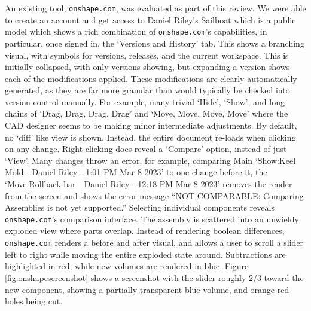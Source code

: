 \documentclass[sigconf,authorversion,nonacm]{acmart}
\begin{document}
An existing tool, \texttt{onshape.com}, was evaluated as part of this review.
We were able to create an account and get access to Daniel Riley's Sailboat
which is a public model which shows a rich combination of \texttt{onshape.com}'s capabilities, in particular, once signed in, the `Versions and History' tab.
This shows a branching visual, with symbols for versions, releases, and the current workspace.
This is initially collapsed, with only versions showing, but expanding a version shows each of the modifications applied.
These modifications are clearly automatically generated, as they are far more granular than would typically be checked into version control manually.
For example, many trivial `Hide', `Show', and long chains of `Drag, Drag, Drag, Drag' and `Move, Move, Move, Move' where the CAD designer seems to be making minor intermediate adjustments.
By default, no `diff' like view is shown.
Instead, the entire document re-loads when clicking on any change.
Right-clicking does reveal a `Compare' option, instead of just `View'.
Many changes throw an error, for example, comparing Main `Show:Keel Mold - Daniel Riley - 1:01 PM Mar 8 2023' to one change before it, the `Move:Rollback bar - Daniel Riley - 12:18 PM Mar 8 2023' removes the render from the screen and shows the error message ``NOT COMPARABLE: Comparing Assemblies is not yet supported.''
Selecting individual components reveals \texttt{onshape.com}'s comparison interface.
The assembly is scattered into an unwieldy exploded view where parts overlap.
Instead of rendering boolean differences, \texttt{onshape.com} renders a before and after visual, and allows a user to scroll a slider left to right while moving the entire exploded state around.
Subtractions are highlighted in red, while new volumes are rendered in blue.
Figure \ref{fig:onshapescreenshot} shows a screenshot with the slider roughly 2/3 toward the new component, showing a partially transparent blue volume, and orange-red holes being cut.
\end{document}
